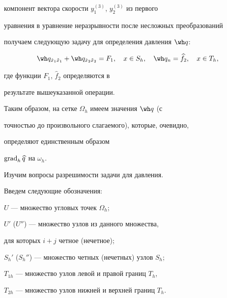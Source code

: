 компонент вектора скорости $y_1^{(3)}$, $y_2^{(3)}$ из первого


уравнения в уравнение неразрывности после несложных преобразований


получаем следующую задачу для определения давления $\wh q$:


\begin{equation}


\wh q_{\hat x_1\tilde x_1}+\wh q_{\hat x_2\tilde


x_2}= F_1,\quad x\in S_h,\quad \wh q_n=\widehat f_2,\quad


x\in T_h,


\end{equation}


где функции $F_1$, $\widehat f_2$ определяются в


результате вышеуказанной операции.





Таким образом, на сетке $\Omega_h$ имеем значения $\wh q$ (с


точностью до произвольного слагаемого), которые, очевидно,


определяют единственным образом


$\operatorname{grad}_h\widehat q$ на $\omega_h$.





Изучим вопросы разрешимости задачи для давления.


Введем следующие обозначения:


$U$ --- множество угловых точек $\Omega_h$;


$U'$ ($U''$) --- множество узлов из данного множества,


для которых $i+j$ четное (нечетное);


$S_h'$ ($S_h''$) --- множество четных (нечетных) узлов $S_h$;


$T_{1h}$ --- множество узлов левой и правой границ $T_h$,


$T_{2h}$ --- множество узлов нижней и верхней границ $T_h$.





